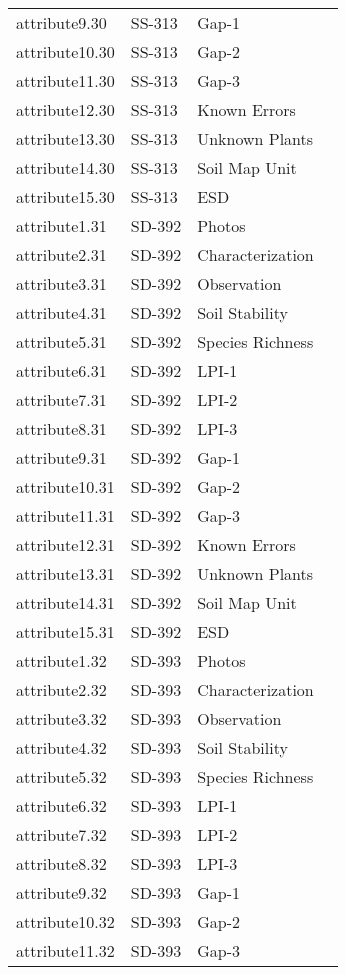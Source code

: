 \documentclass[
]{article}
\begin{document}
\begin{longtable}[]{@{}llll@{}}
attribute9.30 & SS-313 & Gap-1 & \\
attribute10.30 & SS-313 & Gap-2 & \\
attribute11.30 & SS-313 & Gap-3 & \\
attribute12.30 & SS-313 & Known Errors & \\
attribute13.30 & SS-313 & Unknown Plants & \\
attribute14.30 & SS-313 & Soil Map Unit & \\
attribute15.30 & SS-313 & ESD & \\
attribute1.31 & SD-392 & Photos & \\
attribute2.31 & SD-392 & Characterization & \\
attribute3.31 & SD-392 & Observation & \\
attribute4.31 & SD-392 & Soil Stability & \\
attribute5.31 & SD-392 & Species Richness & \\
attribute6.31 & SD-392 & LPI-1 & \\
attribute7.31 & SD-392 & LPI-2 & \\
attribute8.31 & SD-392 & LPI-3 & \\
attribute9.31 & SD-392 & Gap-1 & \\
attribute10.31 & SD-392 & Gap-2 & \\
attribute11.31 & SD-392 & Gap-3 & \\
attribute12.31 & SD-392 & Known Errors & \\
attribute13.31 & SD-392 & Unknown Plants & \\
attribute14.31 & SD-392 & Soil Map Unit & \\
attribute15.31 & SD-392 & ESD & \\
attribute1.32 & SD-393 & Photos & \\
attribute2.32 & SD-393 & Characterization & \\
attribute3.32 & SD-393 & Observation & \\
attribute4.32 & SD-393 & Soil Stability & \\
attribute5.32 & SD-393 & Species Richness & \\
attribute6.32 & SD-393 & LPI-1 & \\
attribute7.32 & SD-393 & LPI-2 & \\
attribute8.32 & SD-393 & LPI-3 & \\
attribute9.32 & SD-393 & Gap-1 & \\
attribute10.32 & SD-393 & Gap-2 & \\
attribute11.32 & SD-393 & Gap-3 & \\

\end{longtable}
\end{document}
